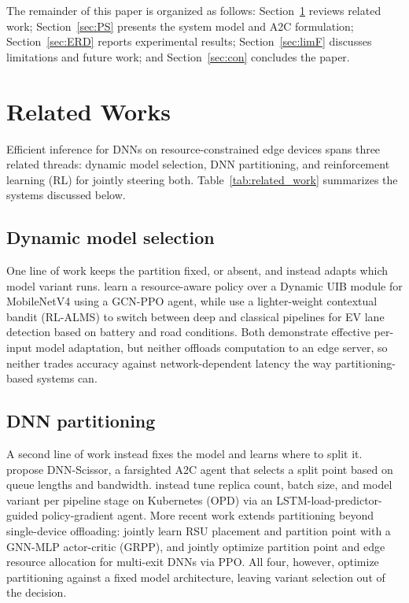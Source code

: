 \documentclass[conference]{IEEEtran}
\begin{document}
The remainder of this paper is organized as follows: Section~\ref{sec:RW} reviews related work; Section~\ref{sec:PS} presents the system model and A2C formulation; Section~\ref{sec:ERD} reports experimental results; Section~\ref{sec:limF} discusses limitations and future work; and Section~\ref{sec:con} concludes the paper.

\section{Related Works} \label{sec:RW}
Efficient inference for DNNs on resource-constrained edge devices spans three related threads: dynamic model selection, DNN partitioning, and reinforcement learning (RL) for jointly steering both. Table~\ref{tab:related_work} summarizes the systems discussed below.

\subsection{Dynamic model selection}
One line of work keeps the partition fixed, or absent, and instead adapts which model variant runs. \citet{zhang2025mobilenetv4} learn a resource-aware policy over a Dynamic UIB module for MobileNetV4 using a GCN-PPO agent, while \citet{rhuthik2025rlalms} use a lighter-weight contextual bandit (RL-ALMS) to switch between deep and classical pipelines for EV lane detection based on battery and road conditions. Both demonstrate effective per-input model adaptation, but neither offloads computation to an edge server, so neither trades accuracy against network-dependent latency the way partitioning-based systems can.

\subsection{DNN partitioning}
A second line of work instead fixes the model and learns where to split it. \citet{lyu2025learning} propose DNN-Scissor, a farsighted A2C agent that selects a split point based on queue lengths and bandwidth. \citet{sheng2025adaptive} instead tune replica count, batch size, and model variant per pipeline stage on Kubernetes (OPD) via an LSTM-load-predictor-guided policy-gradient agent. More recent work extends partitioning beyond single-device offloading: \citet{zhang2025joint} jointly learn RSU placement and partition point with a GNN-MLP actor-critic (GRPP), and \citet{ma2025joint} jointly optimize partition point and edge resource allocation for multi-exit DNNs via PPO. All four, however, optimize partitioning against a fixed model architecture, leaving variant selection out of the decision.
\end{document}
